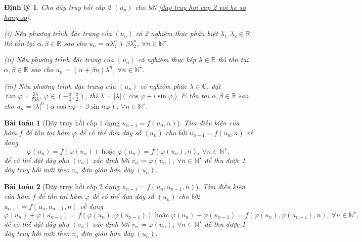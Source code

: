 \documentclass{article}
\newtheorem{baitoan}{Bài toán}
\newtheorem{dinhly}{Định lý}
\begin{document}
\begin{dinhly}
	Cho dãy truy hồi cấp 2 $(u_n)$ cho bởi \eqref{day truy hoi cap 2 voi he so hang so}.
	\item(i) Nếu phương trình đặc trưng của $(u_n)$ có 2 nghiệm thực phân biệt $\lambda_1,\lambda_2\in\mathbb{R}$ thì tồn tại $\alpha,\beta\in\mathbb{R}$ sao cho $u_n = \alpha\lambda_1^n + \beta\lambda_2^n$, $\forall n\in\mathbb{N}^\star$.
	\item(ii) Nếu phương trình đặc trưng của $(u_n)$ có nghiệm thực kép $\lambda\in\mathbb{R}$ thì tồn tại $\alpha,\beta\in\mathbb{R}$ sao cho $u_n = (\alpha + \beta n)\lambda^n$, $\forall n\in\mathbb{N}^\star$.
	\item(iii) Nếu phương trình đặc trưng của $(u_n)$ có nghiệm phức $\lambda\in\mathbb{C}$, đặt $\tan\varphi = \frac{\Im\lambda}{\Re\lambda}$, $\varphi\in\left(-\frac{\pi}{2},\frac{\pi}{2}\right)$, thì $\lambda = |\lambda|(\cos\varphi + i\sin\varphi)$ \& tồn tại $\alpha,\beta\in\mathbb{R}$ sao cho $u_n = |\lambda|^n(\alpha\cos n\varphi + \beta\sin n\varphi)$, $\forall n\in\mathbb{N}^\star$.
\end{dinhly}

\begin{baitoan}[Dãy truy hồi cấp 1 dạng $u_{n+1} = f(u_n,n)$]
	Tìm điều kiện của hàm $f$ để tồn tại hàm $\varphi$ để có thể đưa dãy số $(u_n)$ cho bởi $u_{n+1} = f(u_n,n)$ về dạng
	\begin{equation*}
		\varphi(u_n) = f(\varphi(u_n))\mbox{ hoặc }\varphi(u_n) = f(\varphi(u_n),n),\ \forall n\in\mathbb{N}^\star,
	\end{equation*}
	để có thể đặt dãy phụ $(v_n)$ xác định bởi $v_n\coloneqq\varphi(u_n)$, $\forall n\in\mathbb{N}^\star$ để thu được 1 dãy truy hồi mới theo $v_n$ đơn giản hơn dãy $(u_n)$.
\end{baitoan}

\begin{baitoan}[Dãy truy hồi cấp 2 dạng $u_{n+1} = f(u_n,u_{n-1},n)$]
	Tìm điều kiện của hàm $f$ để tồn tại hàm $\varphi$ để có thể đưa dãy số $(u_n)$ cho bởi $u_{n+1} = f(u_n,u_{n-1},n)$ về dạng
	\begin{equation*}
		\varphi(u_n) + \varphi(u_{n-1}) = f(\varphi(u_n),\varphi(u_{n-1}))\mbox{ hoặc }\varphi(u_n) + \varphi(u_{n-1}) = f(\varphi(u_n),\varphi(u_{n-1}),n),\ \forall n\in\mathbb{N}^\star,
	\end{equation*}
	để có thể đặt dãy phụ $(v_n)$ xác định bởi $v_n\coloneqq\varphi(u_n)$, $\forall n\in\mathbb{N}^\star$ để thu được 1 dãy truy hồi mới theo $v_n$ đơn giản hơn dãy $(u_n)$.
\end{baitoan}
\end{document}
